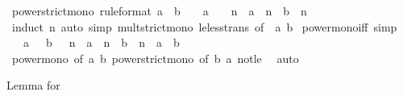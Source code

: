 \begin{isabellebody}
\endisatagproof
{\isafoldproof}%
%
\isadelimproof
\isanewline
%
\endisadelimproof
\isanewline
{}\isamarkupfalse%
\ power{\isacharunderscore}{\kern0pt}strict{\isacharunderscore}{\kern0pt}mono\ {\isacharbrackleft}{\kern0pt}rule{\isacharunderscore}{\kern0pt}format{\isacharbrackright}{\kern0pt}{\isacharcolon}{\kern0pt}\ {\isachardoublequoteopen}a\ {\isacharless}{\kern0pt}\ b\ {\isasymLongrightarrow}\ {}\ {\isasymle}\ a\ {\isasymLongrightarrow}\ {}\ {\isacharless}{\kern0pt}\ n\ {\isasymlongrightarrow}\ a\ {\isacharcircum}{\kern0pt}\ n\ {\isacharless}{\kern0pt}\ b\ {\isacharcircum}{\kern0pt}\ n{\isachardoublequoteclose}\isanewline
%
\isadelimproof
\ \ %
\endisadelimproof
%
\isatagproof
{}\isamarkupfalse%
\ {\isacharparenleft}{\kern0pt}induct\ n{\isacharparenright}{\kern0pt}\ {\isacharparenleft}{\kern0pt}auto\ simp{\isacharcolon}{\kern0pt}\ mult{\isacharunderscore}{\kern0pt}strict{\isacharunderscore}{\kern0pt}mono\ le{\isacharunderscore}{\kern0pt}less{\isacharunderscore}{\kern0pt}trans\ {\isacharbrackleft}{\kern0pt}of\ {}\ a\ b{\isacharbrackright}{\kern0pt}{\isacharparenright}{\kern0pt}%
\endisatagproof
{\isafoldproof}%
%
\isadelimproof
\isanewline
%
\endisadelimproof
\isanewline
{}\isamarkupfalse%
\ power{\isacharunderscore}{\kern0pt}mono{\isacharunderscore}{\kern0pt}iff\ {\isacharbrackleft}{\kern0pt}simp{\isacharbrackright}{\kern0pt}{\isacharcolon}{\kern0pt}\isanewline
\ \ \ {\isachardoublequoteopen}{\isasymlbrakk}a\ {\isasymge}\ {}{\isacharsemicolon}{\kern0pt}\ b\ {\isasymge}\ {}{\isacharsemicolon}{\kern0pt}\ n{\isachargreater}{\kern0pt}{}{\isasymrbrakk}\ {\isasymLongrightarrow}\ a\ {\isacharcircum}{\kern0pt}\ n\ {\isasymle}\ b\ {\isacharcircum}{\kern0pt}\ n\ {\isasymlongleftrightarrow}\ a\ {\isasymle}\ b{\isachardoublequoteclose}\isanewline
%
\isadelimproof
\ \ %
\endisadelimproof
%
\isatagproof
{}\isamarkupfalse%
\ power{\isacharunderscore}{\kern0pt}mono\ {\isacharbrackleft}{\kern0pt}of\ a\ b{\isacharbrackright}{\kern0pt}\ power{\isacharunderscore}{\kern0pt}strict{\isacharunderscore}{\kern0pt}mono\ {\isacharbrackleft}{\kern0pt}of\ b\ a{\isacharbrackright}{\kern0pt}\ not{\isacharunderscore}{\kern0pt}le\ \isamarkupfalse%
\ auto%
\endisatagproof
{\isafoldproof}%
%
\isadelimproof
%
\endisadelimproof
%
\begin{isamarkuptext}%
Lemma for %
\end{isamarkuptext}\isamarkuptrue%

\end{isabellebody}
